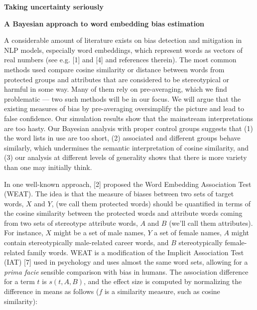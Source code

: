 \documentclass[
  12pt,
  dvipsnames,enabledeprecatedfontcommands]{scrartcl}
\author{}
\date{\vspace{-2.5em}}
\begin{document}
\begin{center}
\large \textbf{Taking uncertainty seriously}

\textbf{A  Bayesian approach to  word embedding bias estimation }
\end{center}

\vspace{1mm}

A considerable amount of literature exists on bias detection and
mitigation in NLP models, especially word embeddings, which represent
words as vectors of real numbers (see e.g. {[}1{]} and {[}4{]} and
references therein). The most common methods used compare cosine
similarity or distance between words from protected groups and
attributes that are considered to be stereotypical or harmful in some
way. Many of them rely on pre-averaging, which we find problematic ---
two such methods will be in our focus. We will argue that the existing
measures of bias by pre-averaging oversimplify the picture and lead to
false confidence. Our simulation results show that the mainstream
interpretations are too hasty. Our Bayesian analysis with proper control
groups suggests that (1) the word lists in use are too short, (2)
associated and different groups behave similarly, which undermines the
semantic interpretation of cosine similarity, and (3) our analysis at
different levels of generality shows that there is more variety than one
may initially think.

In one well-known approach, {[}2{]} proposed the Word Embedding
Association Test (WEAT). The idea is that the measure of biases between
two sets of target words, \(X\) and \(Y\), (we call them protected
words) should be quantified in terms of the cosine similarity between
the protected words and attribute words coming from two sets of
stereotype attribute words, \(A\) and \(B\) (we'll call them
attributes). For instance, \(X\) might be a set of male names, \(Y\) a
set of female names, \(A\) might contain stereotypically male-related
career words, and \(B\) stereotypically female-related family words.
WEAT is a modification of the Implicit Association Test (IAT) {[}7{]}
used in psychology and uses almost the same word sets, allowing for a
\emph{prima facie} sensible comparison with bias in humans. The
association difference for a term \(t\) is \(s(t,A,B)\), and the effect
size is computed by normalizing the difference in means as follows
(\(f\) is a similarity measure, such as cosine similarity):

\vspace{-3mm}
\end{document}
